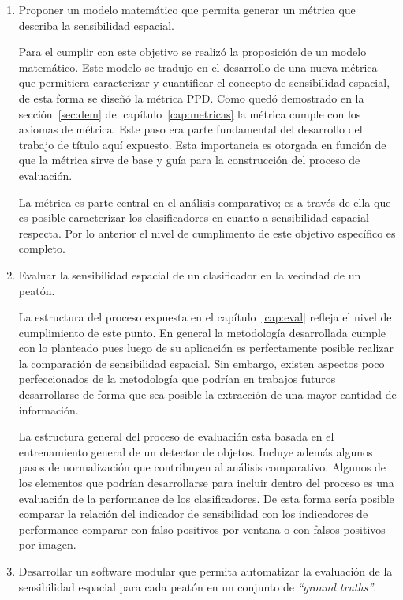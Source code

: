 \begin{enumerate}

\item Proponer un modelo matemático que permita generar un métrica que describa la sensibilidad espacial.

\subitem Para el cumplir con este objetivo se realizó la proposición de un modelo matemático. Este modelo se tradujo en el desarrollo de una nueva métrica que permitiera caracterizar y cuantificar el concepto de sensibilidad espacial, de esta forma se diseñó la métrica PPD. Como quedó demostrado en la sección~\ref{sec:dem} del capítulo~\ref{cap:metricas} la métrica cumple con los axiomas de métrica. Este paso era parte fundamental del desarrollo del trabajo de título aquí expuesto. Esta importancia es otorgada en función de que la métrica sirve de base y guía para la construcción del proceso de evaluación. 

\subitem La métrica es parte central en el análisis comparativo; es a través de ella que es posible caracterizar los clasificadores en cuanto a sensibilidad espacial respecta. Por lo anterior el nivel de cumplimento de este objetivo específico es completo.

\item Evaluar la sensibilidad espacial de un clasificador en la vecindad de un peatón.

\subitem La estructura del proceso expuesta en el capítulo~\ref{cap:eval} refleja el nivel de cumplimiento de este punto. En general la metodología desarrollada cumple con lo planteado pues luego de su aplicación es perfectamente posible realizar la comparación de sensibilidad espacial. Sin embargo, existen aspectos poco perfeccionados de la metodología que podrían en trabajos futuros desarrollarse de forma que sea posible la extracción de una mayor cantidad de información. 

\subitem La estructura general del proceso de evaluación esta basada en el entrenamiento general de un detector de objetos. Incluye además algunos pasos de normalización que contribuyen al análisis comparativo. Algunos de los elementos que podrían desarrollarse para incluir dentro del proceso es una evaluación de la performance de los clasificadores. De esta forma sería posible comparar la relación del indicador de sensibilidad con los indicadores de performance \ie comparar con falso positivos por ventana o con falsos positivos por imagen.


\item Desarrollar un software modular que permita automatizar la evaluación de la sensibilidad espacial para cada peatón en un conjunto de \textit{``ground truths''}.


\end{enumerate}
